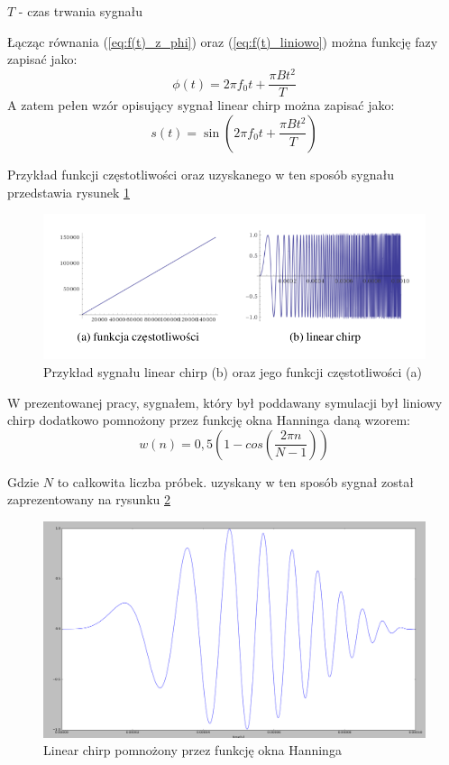 	$T$ - czas trwania sygnału
	
	Łącząc równania (\ref{eq:f(t)_z_phi}) oraz (\ref{eq:f(t)_liniowo}) można funkcję fazy zapisać jako:
	\begin{equation}
	\phi (t) = 2\pi f_0t+\frac{\pi Bt^2}{T} \label{eq:phi(t)}
	\end{equation}
	A zatem pełen wzór opisujący sygnał linear chirp można zapisać jako:
	\begin{equation}
	s(t) = \sin(2\pi f_0t+\frac{\pi Bt^2}{T})
	\end{equation}
	
	Przykład funkcji częstotliwości oraz uzyskanego w ten sposób sygnału przedstawia rysunek \ref{fig:linear_chirp}
\begin{figure}[h]
\centering
\includegraphics[width=14cm]{Zdjecia/4/linear_chirp}
\caption{Przykład sygnału linear chirp (b) oraz jego funkcji częstotliwości (a)}
\label{fig:linear_chirp}
\end{figure}

W prezentowanej pracy, sygnałem, który był poddawany symulacji był liniowy chirp dodatkowo pomnożony przez funkcję okna Hanninga daną wzorem:
\begin{equation}
w(n)=0,5(1-cos(\frac{2\pi n}{N-1})) \label{eq:okno_hanninga}
\end{equation}

Gdzie $N$ to całkowita liczba próbek. uzyskany w ten sposób sygnał został zaprezentowany na rysunku \ref{fig:test_chirp}
\begin{figure}[h]
\centering
\includegraphics[width=14cm]{Zdjecia/4/test_chirp}
\caption{Linear chirp pomnożony przez funkcję okna Hanninga}
\label{fig:test_chirp}
\end{figure}